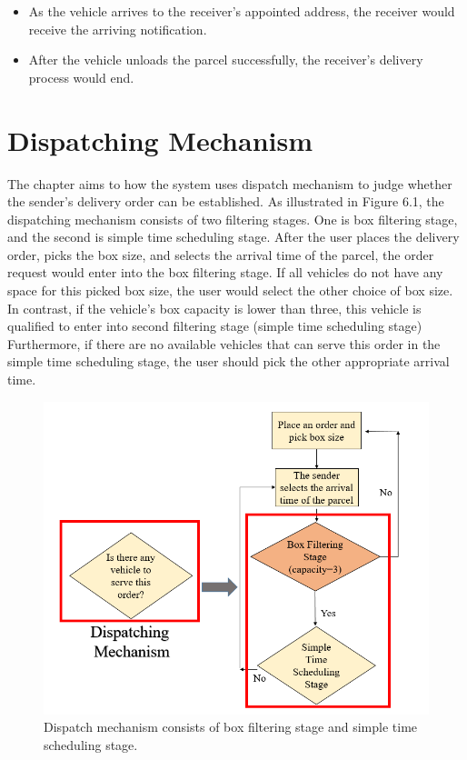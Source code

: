 \documentclass[12pt]{ksthesis}
\begin{document}
\begin{thesis}
{\begin{itemize}
\item
As the vehicle arrives to the receiver’s appointed address, the receiver would receive the arriving notification.

\item
After the vehicle unloads the parcel successfully, the receiver’s delivery process would end.

\end{itemize}


\chapter{Dispatching Mechanism}\label{Chap:Dispatching Mechanism}
The chapter aims to how the system uses dispatch mechanism to judge whether the sender’s delivery order can be established.
As illustrated in Figure 6.1, the dispatching mechanism consists of two filtering stages. One is box filtering stage, and the second is simple time scheduling stage. After the user places the delivery order, picks the box size, and selects the arrival time of the parcel, the order request would enter into the box filtering stage.
If all vehicles do not have any space for this picked box size, the user would select the other choice of box size. In contrast, if the vehicle’s box capacity is lower than three, this vehicle is qualified to enter into second filtering stage (simple time scheduling stage) 
Furthermore, if there are no available vehicles that can serve this order in the simple time scheduling stage, the user should pick the other appropriate arrival time.

\begin{figure}[H]
\centering
\includegraphics[width=1.0\textwidth]{./Thesis_figures/F6-1_dispatching_mechanism.PNG}
\caption{\large Dispatch mechanism consists of box filtering stage and simple time scheduling stage.}
\vspace{0.5cm}
\label{Fig:Dispatch_mechanism}
\end{figure}

}
\end{thesis}
\end{document}
